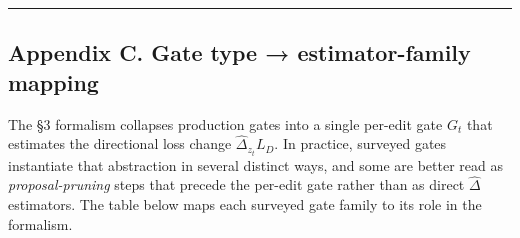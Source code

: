 \documentclass[
]{article}
\begin{document}
\begin{center}\rule{0.5\linewidth}{0.5pt}\end{center}

\subsection{Appendix C. Gate type → estimator-family
mapping}\label{appendix-c.-gate-type-estimator-family-mapping}

The §3 formalism collapses production gates into a single per-edit gate
\(G_t\) that estimates the directional loss change
\(\widehat{\Delta}_{z_t} L_D\). In practice, surveyed gates instantiate
that abstraction in several distinct ways, and some are better read as
\emph{proposal-pruning} steps that precede the per-edit gate rather than
as direct \(\widehat{\Delta}\) estimators. The table below maps each
surveyed gate family to its role in the formalism.
\end{document}
